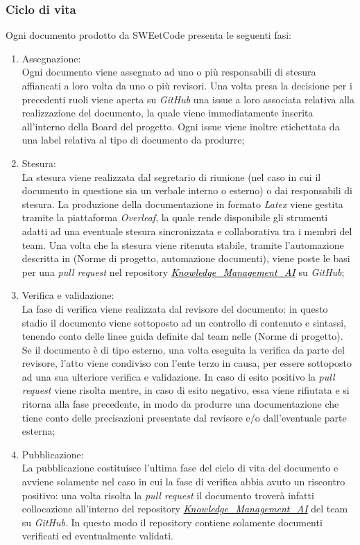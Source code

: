 \documentclass[10pt, a4paper]{article}
\begin{document}
\subsubsection{Ciclo di vita}
\label{sec:ciclo_vita}
Ogni documento prodotto da SWEetCode presenta le seguenti fasi:
\begin{enumerate}
    \item Assegnazione: \\
    Ogni documento viene assegnato ad uno o più responsabili di stesura affiancati a loro volta da uno o più revisori.
    Una volta presa la decisione per i precedenti ruoli viene aperta su \textit{GitHub} una issue a loro associata relativa alla  realizzazione del documento, la quale viene immediatamente inserita all'interno della Board del progetto. Ogni issue viene inoltre etichettata da una label relativa al tipo di documento da produrre;
    \item Stesura: \\
    La stesura viene realizzata dal segretario di riunione (nel caso in cui il documento in questione sia un verbale interno o esterno) o dai responsabili di stesura.
    La produzione della documentazione in formato \textit{Latex} viene gestita tramite la piattaforma \textit{Overleaf}, la quale rende disponibile gli strumenti adatti
    ad una eventuale stesura sincronizzata e collaborativa tra i membri del team. Una volta che la stesura viene ritenuta stabile, tramite l'automazione descritta in (Norme di progetto, automazione documenti),
    viene poste le basi per una \textit{pull request} nel repository \href{https://github.com/sweetcode-team/Knowledge_Management_AI}{\textcolor{black}{\textit{Knowledge\_Management\_AI}}} su \textit{GitHub};
    \item Verifica e validazione: \\
    La fase di verifica viene realizzata dal revisore del documento: in questo stadio il documento viene sottoposto ad un controllo di contenuto e sintassi, tenendo conto delle linee guida definite dal team nelle (Norme di progetto). 
    Se il documento è di tipo esterno, una volta eseguita la verifica da parte del revisore, l'atto viene condiviso con l'ente terzo in causa, per essere sottoposto ad una sua ulteriore verifica e validazione.
    In caso di esito positivo la \textit{pull request} viene risolta mentre, in caso di esito negativo, essa viene rifiutata e si ritorna alla fase precedente, in modo da produrre una documentazione che tiene conto delle precisazioni presentate dal revisore e/o dall'eventuale parte esterna;
    \item Pubblicazione: \\
    La pubblicazione costituisce l'ultima fase del ciclo di vita del documento e avviene solamente nel caso in cui la fase di verifica abbia avuto un riscontro positivo: una volta risolta la
    \textit{pull request} il documento troverà infatti collocazione all'interno del repository
    \href{https://github.com/sweetcode-team/Knowledge_Management_AI}{\textcolor{black}{\textit{Knowledge\_Management\_AI}}} del team su \textit{GitHub}.
    In questo modo il repository contiene solamente documenti verificati ed eventualmente validati.
\end{enumerate}
\end{document}
